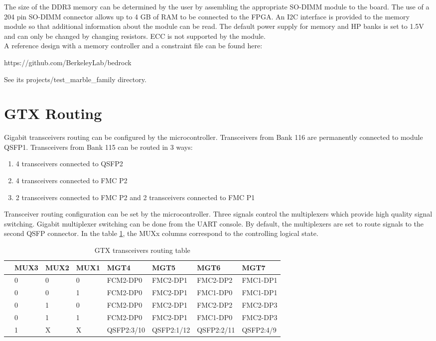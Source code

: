 \documentclass[12pt,oneside,a4]{article}
\begin{document}
The size of the DDR3 memory can be determined by the user by assembling the appropriate SO-DIMM module to the board. The use of a 204 pin SO-DIMM connector allows up to 4 GB of RAM to be connected to the FPGA. An I2C interface is provided to the memory module so that additional information about the module can be read. The default power supply for memory and HP banks is set to 1.5V and can only be changed by changing resistors. ECC is not supported by the module.\\

A reference design with a memory controller and a constraint file can be found here:
\begin{leftbar}
https://github.com/BerkeleyLab/bedrock
\end{leftbar}
See its projects/test\_marble\_family directory.

\section{GTX Routing}
Gigabit transceivers routing can be configured by the microcontroller. Transceivers from Bank 116 are permanently connected to module QSFP1. Transceivers from Bank 115 can be routed in 3 ways:
\begin{enumerate}
    \item 4 transceivers connected to QSFP2
    \item 4 transceivers connected to FMC P2
    \item 2 transceivers connected to FMC P2 and 2 transceivers connected to FMC P1
\end{enumerate}

Transceiver routing configuration can be set by the microcontroller. Three signals control the multiplexers which provide high quality signal switching. Gigabit multiplexer switching can be done from the UART console. By default, the multiplexers are set to route signals to the second QSFP connector. In the table \ref{table}, the MUXx columns correspond to the controlling logical state.

\begin{table}[htbp]
\begin{tabular}{@{}llllllll@{}}
\toprule
 & MUX3 & MUX2 & MUX1 & MGT4       & MGT5       & MGT6       & MGT7      \\ \midrule
 & 0    & 0    & 0    & FCM2-DP0   & FMC2-DP1   & FMC2-DP2   & FMC1-DP1  \\
 & 0    & 0    & 1    & FCM2-DP0   & FMC2-DP1   & FMC1-DP0   & FMC1-DP1  \\
 & 0    & 1    & 0    & FCM2-DP0   & FMC2-DP1   & FMC2-DP2   & FMC2-DP3  \\
 & 0    & 1    & 1    & FCM2-DP0   & FMC2-DP1   & FMC1-DP0   & FMC2-DP3  \\
 & 1    & X    & X    & QSFP2:3/10 & QSFP2:1/12 & QSFP2:2/11 & QSFP2:4/9 \\ \bottomrule
\end{tabular}
\caption{GTX transceivers routing table}\label{table}
\end{table}
\end{document}
